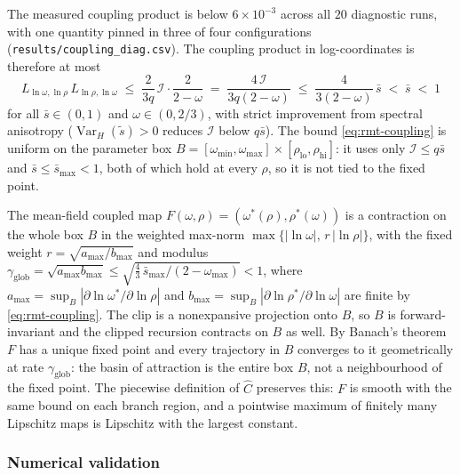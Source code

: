 The measured coupling product is below $6\times10^{-3}$ across all $20$ diagnostic runs, with one quantity pinned in three of four configurations (\texttt{results/coupling\_diag.csv}).
The coupling product in log-coordinates is therefore at most
\begin{equation}
\label{eq:rmt-coupling}
L_{\ln \omega, \ln\rho}\,L_{\ln\rho, \ln \omega}
\;\le\; \frac{2}{3q}\,\mathcal I \cdot \frac{2}{2-\omega}
\;=\; \frac{4\,\mathcal I}{3q(2-\omega)}
\;\le\; \frac{4}{3(2-\omega)}\,\bar s
\;<\; \bar s
\;<\; 1
\end{equation}
for all $\bar s \in (0,1)$ and $\omega \in (0, 2/3)$, with strict improvement from spectral anisotropy ($\operatorname{Var}_H(\tilde s) > 0$ reduces $\mathcal I$ below $q\bar s$).
The bound \eqref{eq:rmt-coupling} is uniform on the parameter box $B = [\omega_{\min},\omega_{\max}]\times[\rho_{\mathrm{lo}},\rho_{\mathrm{hi}}]$: it uses only $\mathcal I \le q\bar s$ and $\bar s \le \bar s_{\max} < 1$, both of which hold at every $\rho$, so it is not tied to the fixed point.
\begin{corollary}
\label{cor:global}
The mean-field coupled map $F(\omega,\rho) = (\omega^*(\rho),\rho^*(\omega))$ is a contraction on the whole box $B$ in the weighted max-norm $\max\{|\ln\omega|,\, r\,|\ln\rho|\}$, with the fixed weight $r = \sqrt{a_{\max}/b_{\max}}$ and modulus $\gamma_{\mathrm{glob}} = \sqrt{a_{\max}b_{\max}} \le \sqrt{\tfrac{4}{3}\,\bar s_{\max}/(2-\omega_{\max})} < 1$, where $a_{\max} = \sup_B |\partial\ln\omega^*/\partial\ln\rho|$ and $b_{\max} = \sup_B |\partial\ln\rho^*/\partial\ln\omega|$ are finite by \eqref{eq:rmt-coupling}.
The clip is a nonexpansive projection onto $B$, so $B$ is forward-invariant and the clipped recursion contracts on $B$ as well.
By Banach's theorem $F$ has a unique fixed point and every trajectory in $B$ converges to it geometrically at rate $\gamma_{\mathrm{glob}}$: the basin of attraction is the entire box $B$, not a neighbourhood of the fixed point.
The piecewise definition of $\widehat C$ preserves this: $F$ is smooth with the same bound on each branch region, and a pointwise maximum of finitely many Lipschitz maps is Lipschitz with the largest constant.
\end{corollary}

\subsubsection{Numerical validation}
\label{app:rmt-validation}

